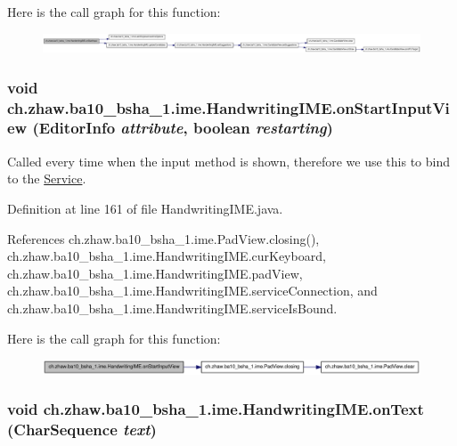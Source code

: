 Here is the call graph for this function:\nopagebreak
\begin{figure}[H]
\begin{center}
\leavevmode
\includegraphics[width=420pt]{classch_1_1zhaw_1_1ba10__bsha__1_1_1ime_1_1HandwritingIME_abb0bfa8e1c7857a88657e6640855af0f_cgraph}
\end{center}
\end{figure}
\hypertarget{classch_1_1zhaw_1_1ba10__bsha__1_1_1ime_1_1HandwritingIME_a731678d503654a151a2204665ec2f018}{
\subsubsection[{onStartInputView}]{\setlength{\rightskip}{0pt plus 5cm}void ch.zhaw.ba10\_\-bsha\_\-1.ime.HandwritingIME.onStartInputView (EditorInfo {\em attribute}, \/  boolean {\em restarting})}}
\label{classch_1_1zhaw_1_1ba10__bsha__1_1_1ime_1_1HandwritingIME_a731678d503654a151a2204665ec2f018}
Called every time when the input method is shown, therefore we use this to bind to the \hyperlink{}{Service}. 

Definition at line 161 of file HandwritingIME.java.

References ch.zhaw.ba10\_\-bsha\_\-1.ime.PadView.closing(), ch.zhaw.ba10\_\-bsha\_\-1.ime.HandwritingIME.curKeyboard, ch.zhaw.ba10\_\-bsha\_\-1.ime.HandwritingIME.padView, ch.zhaw.ba10\_\-bsha\_\-1.ime.HandwritingIME.serviceConnection, and ch.zhaw.ba10\_\-bsha\_\-1.ime.HandwritingIME.serviceIsBound.

Here is the call graph for this function:\nopagebreak
\begin{figure}[H]
\begin{center}
\leavevmode
\includegraphics[width=399pt]{classch_1_1zhaw_1_1ba10__bsha__1_1_1ime_1_1HandwritingIME_a731678d503654a151a2204665ec2f018_cgraph}
\end{center}
\end{figure}
\hypertarget{classch_1_1zhaw_1_1ba10__bsha__1_1_1ime_1_1HandwritingIME_aaa0fc01a36b17c423c223f0dce23390d}{
\subsubsection[{onText}]{\setlength{\rightskip}{0pt plus 5cm}void ch.zhaw.ba10\_\-bsha\_\-1.ime.HandwritingIME.onText (CharSequence {\em text})}}
\label{classch_1_1zhaw_1_1ba10__bsha__1_1_1ime_1_1HandwritingIME_aaa0fc01a36b17c423c223f0dce23390d}


